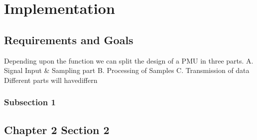 \chapter{Implementation}
\section{Requirements and Goals}
Depending upon the function we can split the design of a PMU in three parts. 
A. Signal Input \& Sampling part
B. Processing of Samples  
C. Transmission of data
Different parts will havediffern
\subsection{Subsection 1}
\section{Chapter 2 Section 2}
